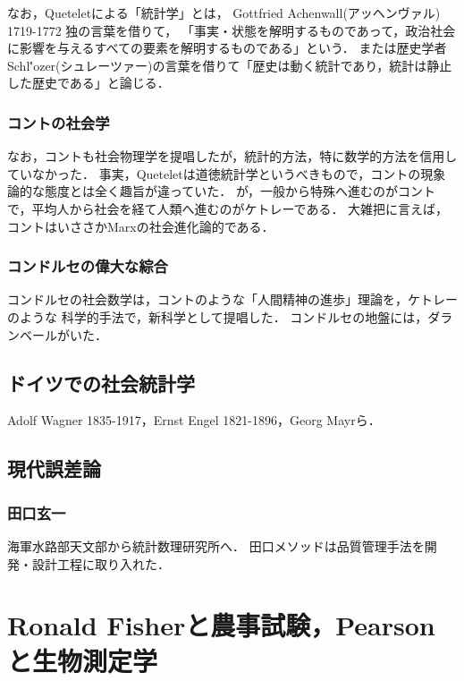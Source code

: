 \documentclass[uplatex,dvipdfmx]{jsreport}
\begin{document}
なお，Queteletによる「統計学」とは，
Gottfried Achenwall(アッヘンヴァル) 1719-1772 独の言葉を借りて，
「事実・状態を解明するものであって，政治社会に影響を与えるすべての要素を解明するものである」という．
または歴史学者Schl\''{o}zer(シュレーツァー)の言葉を借りて「歴史は動く統計であり，統計は静止した歴史である」と論じる．

\subsection{コントの社会学}

なお，コントも社会物理学を提唱したが，統計的方法，特に数学的方法を信用していなかった．
事実，Queteletは道徳統計学というべきもので，コントの現象論的な態度とは全く趣旨が違っていた．
が，一般から特殊へ進むのがコントで，平均人から社会を経て人類へ進むのがケトレーである．
大雑把に言えば，コントはいささかMarxの社会進化論的である．

\subsection{コンドルセの偉大な綜合}

コンドルセの社会数学は，コントのような「人間精神の進歩」理論を，ケトレーのような
科学的手法で，新科学として提唱した．
コンドルセの地盤には，ダランベールがいた．

\section{ドイツでの社会統計学}

\begin{tcolorbox}[colframe=ForestGreen, colback=ForestGreen!10!white,breakable,colbacktitle=ForestGreen!40!white,coltitle=black,fonttitle=\bfseries\sffamily,
title=]
    Adolf Wagner 1835-1917，Ernst Engel 1821-1896，Georg Mayrら．
\end{tcolorbox}

\section{現代誤差論}

\subsection{田口玄一}

海軍水路部天文部から統計数理研究所へ．
田口メソッドは品質管理手法を開発・設計工程に取り入れた．

\chapter{Ronald Fisherと農事試験，Pearsonと生物測定学}
\end{document}
